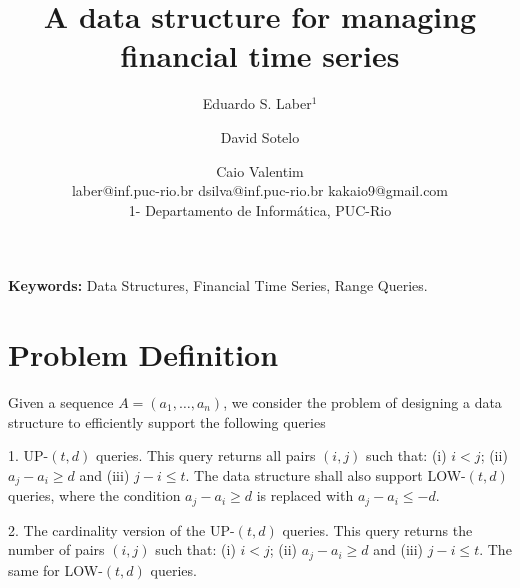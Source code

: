 \documentclass[12pt,letterpaper]{article}
\begin{document}
\newtheorem{remark}{Remark}
\newtheorem{lemma}{Lemma}
\newtheorem{property}{Property}

\newtheorem{theorem}{Theorem}
\newtheorem{corollary}{Corollary}
\newtheorem{fact}{Fact}
\newtheorem{definition}{Definition}
\newtheorem{proposition}{Proposition}
\newcommand{\DT}{ $D$ }

\title{A data structure for managing financial time series}

\medskip

\normalsize

 \author{Eduardo S. Laber$^1$ \and David Sotelo \and Caio Valentim \\
 laber@inf.puc-rio.br dsilva@inf.puc-rio.br kakaio9@gmail.com  \\
1- Departamento de Inform\' atica, PUC-Rio }


\date{}

\maketitle

\date{}



\begin{abstract}
\end{abstract}

\bigskip

 {\bf Keywords: } Data Structures, Financial Time Series, Range Queries.
 

\bigskip

 \section{Problem Definition}



Given a  sequence
$A=(a_1,\ldots,a_n)$,
we consider
the 
problem of designing a data structure to efficiently support
the following queries


1.  UP-$(t,d)$  queries. This
query  returns all
pairs $(i,j)$ such that: (i) $i<j$;
(ii) $a_j-a_i \geq d $ and 
(iii) $j-i \leq t$.  
The data structure shall also support
LOW-$(t,d)$ queries, where 
the condition  $a_j-a_i \geq d$ is
replaced with $a_j-a_i \leq - d$.


2. The cardinality version of the UP-$(t,d)$  queries. This
query  returns the number of pairs
 $(i,j)$ such that: (i) $i<j$;
(ii) $a_j-a_i \geq d $ and 
(iii) $j-i \leq t$.  The same
for LOW-$(t,d)$ queries.
\end{document}
